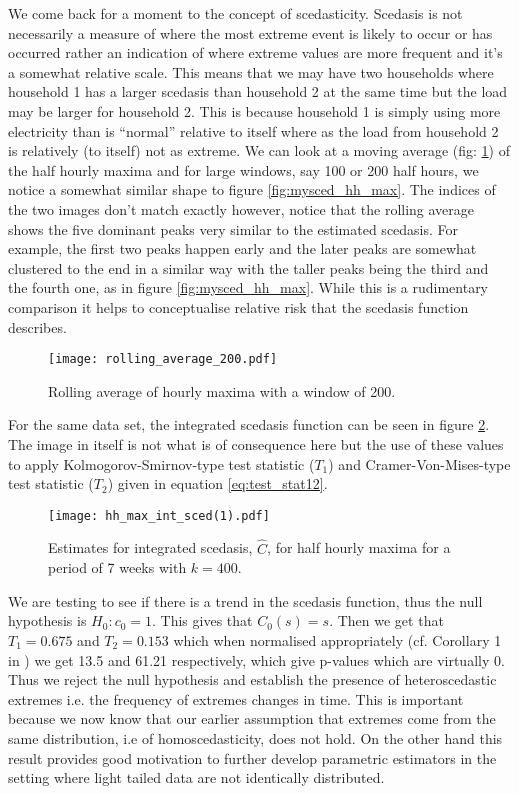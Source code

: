 We come back for a moment to the concept of scedasticity. Scedasis is not necessarily a measure of where the most extreme event is likely to occur or has occurred rather an indication of where extreme values are more frequent and it's a somewhat relative scale. This means that we may have two households where household 1 has a larger scedasis than household 2 at the same time but the load may be larger for household 2. This is because household 1 is simply using more electricity  than is ``normal'' relative to itself where as the load from household 2 is relatively (to itself) not as extreme. %
We can look at a moving average (fig: \ref{fig:rollmean}) of the half hourly maxima and for large windows, say 100 or 200 half hours, we notice a somewhat similar shape to figure \ref{fig:mysced_hh_max}. The indices of the two images don't match exactly however, notice that the rolling average shows the five dominant peaks very similar to the estimated scedasis. For example, the first two peaks happen early and the later peaks are somewhat clustered to the end in a similar way with the taller peaks being the third and the fourth one, as in figure \ref{fig:mysced_hh_max}. While this is a rudimentary comparison it helps to conceptualise relative risk that the scedasis function describes.

\begin{figure}
\centering
\texttt{[image: rolling\_average\_200.pdf]}
\caption{\label{fig:rollmean} Rolling average of hourly maxima with a window of 200.}
\end{figure}

For the same data set, the integrated scedasis function can be seen in figure \ref{fig:myintsced_hh_max}. The image in itself is not what is of consequence here but the use of these values to apply Kolmogorov-Smirnov-type test statistic ($T_1$) and Cramer-Von-Mises-type test statistic ($T_2$) given in equation \ref{eq:test_stat12}.
%
\begin{figure}
\centering
\texttt{[image: hh\_max\_int\_sced(1).pdf]}
\caption{\label{fig:myintsced_hh_max} Estimates for integrated scedasis, $\hat{C}$, for half hourly maxima for a period of 7 weeks with $k=400$.}
\end{figure}
%
We are testing to see if there is a trend in the scedasis function, thus the null hypothesis is $H_0: c_0 =1$. This gives that $C_0(s) = s$. Then we get that $T_1 = 0.675$ and $T_2 = 0.153$ which when normalised appropriately (cf. Corollary 1 in \citet{einmahl16}) we get 13.5 and 61.21 respectively, which give p-values which are virtually 0.%
Thus we reject the null hypothesis and establish the presence of heteroscedastic extremes i.e. the frequency of extremes changes in time. This is important because we now know that our earlier assumption that extremes come from the same distribution, i.e of homoscedasticity, does not hold. On the other hand this result provides good motivation to further develop parametric estimators in the setting where light tailed data are not identically distributed.

